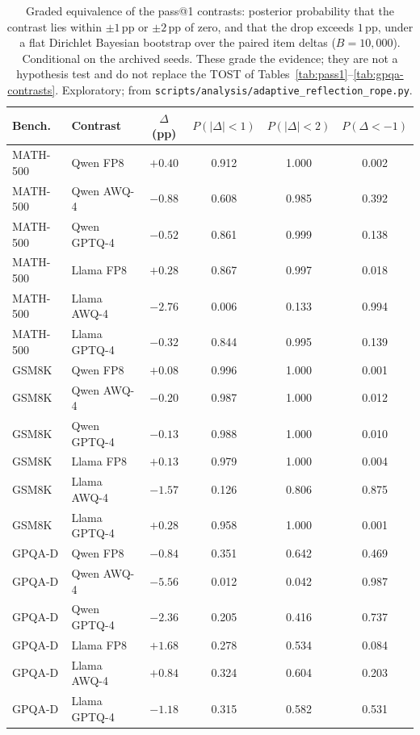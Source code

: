 \documentclass[11pt,a4paper]{article}
\begin{document}
\begin{table}[!htbp]
\centering
\caption{Graded equivalence of the pass@1 contrasts: posterior probability that the contrast lies within $\pm 1$\,pp or $\pm 2$\,pp of zero, and that the drop exceeds $1$\,pp, under a flat Dirichlet Bayesian bootstrap over the paired item deltas ($B=10{,}000$). Conditional on the archived seeds. These grade the evidence; they are not a hypothesis test and do not replace the TOST of Tables~\ref{tab:pass1}--\ref{tab:gpqa-contrasts}. Exploratory; from \texttt{scripts/analysis/adaptive\_reflection\_rope.py}.}
\label{tab:rope}
\small
\begin{tabular}{llcccc}
\toprule
\textbf{Bench.} & \textbf{Contrast} & $\Delta$ (pp) & $P(|\Delta|<1)$ & $P(|\Delta|<2)$ & $P(\Delta<-1)$ \\
\midrule
MATH-500 & Qwen FP8 & $+0.40$ & 0.912 & 1.000 & 0.002 \\
MATH-500 & Qwen AWQ-4 & $-0.88$ & 0.608 & 0.985 & 0.392 \\
MATH-500 & Qwen GPTQ-4 & $-0.52$ & 0.861 & 0.999 & 0.138 \\
MATH-500 & Llama FP8 & $+0.28$ & 0.867 & 0.997 & 0.018 \\
MATH-500 & Llama AWQ-4 & $-2.76$ & 0.006 & 0.133 & 0.994 \\
MATH-500 & Llama GPTQ-4 & $-0.32$ & 0.844 & 0.995 & 0.139 \\
\midrule
GSM8K & Qwen FP8 & $+0.08$ & 0.996 & 1.000 & 0.001 \\
GSM8K & Qwen AWQ-4 & $-0.20$ & 0.987 & 1.000 & 0.012 \\
GSM8K & Qwen GPTQ-4 & $-0.13$ & 0.988 & 1.000 & 0.010 \\
GSM8K & Llama FP8 & $+0.13$ & 0.979 & 1.000 & 0.004 \\
GSM8K & Llama AWQ-4 & $-1.57$ & 0.126 & 0.806 & 0.875 \\
GSM8K & Llama GPTQ-4 & $+0.28$ & 0.958 & 1.000 & 0.001 \\
\midrule
GPQA-D & Qwen FP8 & $-0.84$ & 0.351 & 0.642 & 0.469 \\
GPQA-D & Qwen AWQ-4 & $-5.56$ & 0.012 & 0.042 & 0.987 \\
GPQA-D & Qwen GPTQ-4 & $-2.36$ & 0.205 & 0.416 & 0.737 \\
GPQA-D & Llama FP8 & $+1.68$ & 0.278 & 0.534 & 0.084 \\
GPQA-D & Llama AWQ-4 & $+0.84$ & 0.324 & 0.604 & 0.203 \\
GPQA-D & Llama GPTQ-4 & $-1.18$ & 0.315 & 0.582 & 0.531 \\
\bottomrule
\end{tabular}
\end{table}
\end{document}
